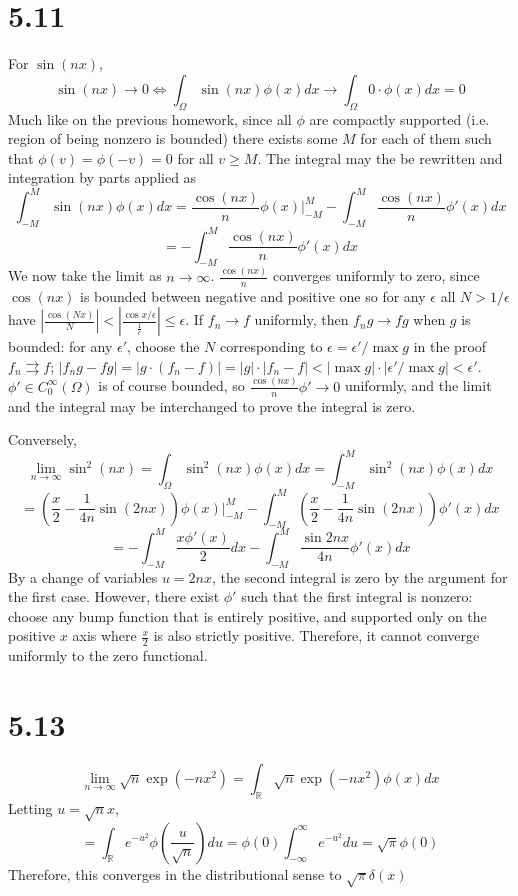 \message{ !name(hw2.tex)}\documentclass{article}
\begin{document}
\section*{5.11}
For $\sin(nx)$,
\[\sin(nx)\to 0\Leftrightarrow\int_\Omega\sin(nx)\phi(x)dx\to \int_\Omega0\cdot\phi(x)dx=0\]
Much like on the previous homework, since all $\phi$ are compactly supported (i.e. region of being nonzero is bounded) there exists some $M$ for each of them such that $\phi(v)=\phi(-v)=0$ for all $v\geq M$. The integral may the be rewritten and integration by parts applied as
\[\int_{-M}^M\sin(nx)\phi(x)dx=\frac{\cos(nx)}{n}\phi(x)\bigg|_{-M}^M-\int_{-M}^M\frac{\cos(nx)}{n}\phi'(x)dx\]
\[=-\int_{-M}^M\frac{\cos(nx)}{n}\phi'(x)dx\]
We now take the limit as $n\to\infty$. $\frac{\cos(nx)}{n}$ converges uniformly to zero, since $\cos(nx)$ is bounded between negative and positive one so for any $\epsilon$ all $N> 1/\epsilon$ have $|\frac{\cos(Nx)}{N}|<|\frac{\cos{x/\epsilon}}{\frac{1}{\epsilon}}| \leq \epsilon$. If $f_n\to f$ uniformly, then $f_ng\to fg$ when $g$ is bounded: for any $\epsilon'$, choose the $N$ corresponding to $\epsilon= \epsilon' / \max{g}$ in the proof $f_n\rightrightarrows f$; $|f_ng-fg| =|g\cdot(f_n-f)| =|g|\cdot|f_n-f|< |\max{g}|\cdot|\epsilon'/\max g| < \epsilon '$. $\phi'\in C_0^\infty(\Omega)$ is of course bounded, so $\frac{\cos(nx)}{n}\phi'\to 0$ uniformly, and the limit and the integral may be interchanged to prove the integral is zero.

Conversely,
\[\lim_{n\to\infty}\sin^2(nx)=\int_\Omega \sin^2(nx)\phi(x)dx=\int_{-M}^M\sin^2(nx)\phi(x)dx\]
\[=\left( \frac{x}{2}-\frac{1}{4n}\sin(2nx)\right)\phi(x)\bigg|_{-M}^M-\int_{-M}^M\left( \frac{x}{2}-\frac{1}{4n}\sin(2nx) \right)\phi'(x)dx\]
\[=-\int_{-M}^M\frac{x\phi'(x)}{2}dx-\int_{-M}^M\frac{\sin{2nx}}{4n}\phi'(x)dx\]
By a change of variables $u=2nx$, the second integral is zero by the argument for the first case. However, there exist $\phi'$ such that the first integral is nonzero: choose any bump function that is entirely positive, and supported only on the positive $x$ axis where $\frac{x}{2}$ is also strictly positive. Therefore, it cannot converge uniformly to the zero functional.

\section*{5.13}

\[\lim_{n\to\infty}\sqrt{n}\exp(-nx^2)=\int_\mathbb{R}\sqrt{n}\exp(-nx^2)\phi(x)dx\]
Letting $u = \sqrt{n}x$,
\[=\int_\mathbb{R}e^{-u^2}\phi\left( \frac{u}{\sqrt{n}} \right)du=\phi(0)\int_{-\infty}^\infty e^{-u^2}du=\sqrt{\pi}\phi(0)\]
Therefore, this converges in the distributional sense to $\sqrt{\pi}\delta(x)$
\end{document}
